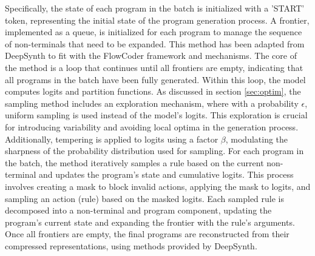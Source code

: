 Specifically, the state of each program in the batch is initialized with a 'START' token, representing the initial state of the program generation process. A frontier, implemented as a queue, is initialized for each program to manage the sequence of non-terminals that need to be expanded. This method has been adapted from DeepSynth to fit with the FlowCoder framework and mechanisms. 
The core of the method is a loop that continues until all frontiers are empty, indicating that all programs in the batch have been fully generated. Within this loop, the model computes logits and partition functions.
As discussed in section \ref{sec:optim}, the sampling method includes an exploration mechanism, where with a probability $\epsilon$, uniform sampling is used instead of the model's logits. This exploration is crucial for introducing variability and avoiding local optima in the generation process. Additionally, tempering is applied to logits using a factor $\beta$, modulating the sharpness of the probability distribution used for sampling.
For each program in the batch, the method iteratively samples a rule based on the current non-terminal and updates the program's state and cumulative logits. This process involves creating a mask to block invalid actions, applying the mask to logits, and sampling an action (rule) based on the masked logits.
Each sampled rule is decomposed into a non-terminal and program component, updating the program's current state and expanding the frontier with the rule's arguments.
Once all frontiers are empty, the final programs are reconstructed from their compressed representations, using methods provided by DeepSynth.


